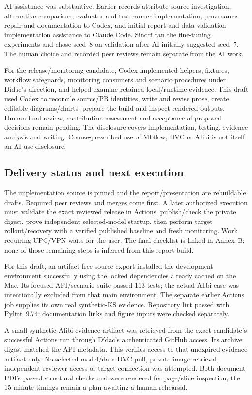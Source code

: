 \documentclass[a4paper,11pt]{article}
\begin{document}
AI assistance was substantive. Earlier records attribute source investigation,
alternative comparison, evaluator and test-runner implementation, provenance
repair and documentation to Codex, and initial report and data-validation
implementation assistance to Claude Code. Sindri ran the fine-tuning experiments
and chose seed~8 on validation after AI initially suggested seed~7. The human
choice and recorded peer reviews remain separate from the AI work.

For the release/monitoring candidate, Codex implemented helpers, fixtures,
workflow safeguards, monitoring consumers and scenario procedures under Dídac's
direction, and helped examine retained local/runtime evidence. This draft used
Codex to reconcile source/PR identities, write and revise prose, create editable
diagrams/charts, prepare the build and inspect rendered outputs. Human final
review, contribution assessment and acceptance of proposed decisions remain
pending. The disclosure covers implementation, testing, evidence analysis and writing.
Course-prescribed use of MLflow, DVC or Alibi is not itself an AI-use disclosure.

\subsection{Delivery status and next execution}

The implementation source is pinned and the report/presentation are rebuildable
drafts. Required peer reviews and merges come first. A later authorized execution
must validate the exact reviewed release in Actions, publish/check the private
digest, prove independent selected-model startup, then perform target
rollout/recovery with a verified published baseline and fresh monitoring. Work
requiring UPC/VPN waits for the user. The final checklist is linked in Annex~B;
none of those remaining steps is inferred from this report build.

For this draft, an artifact-free source export installed the development
environment successfully using the locked dependencies already cached on the Mac.
Its focused API/scenario suite passed 113 tests; the actual-Alibi case was
intentionally excluded from that main environment. The separate earlier Actions
job supplies its own real synthetic-KS evidence. Repository lint passed with
Pylint~9.74; documentation links and figure inputs were checked separately.

A small synthetic Alibi evidence artifact was retrieved from the exact candidate's
successful Actions run through Dídac's authenticated GitHub access. Its archive
digest matched the API metadata. This verifies access to that unexpired evidence
artifact only. No selected-model/data DVC pull, private image retrieval,
independent reviewer access or target connection was attempted. Both document
PDFs passed structural checks and were rendered for page/slide inspection; the
15-minute timings remain a plan awaiting a human rehearsal.
\end{document}

